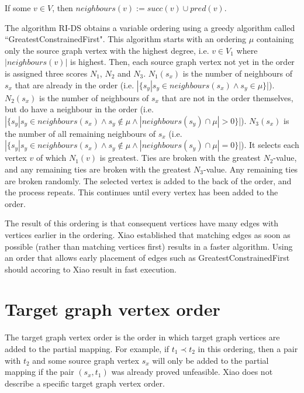 \begin{defn}
If some $v\in V$, then $\mathit{neighbours}(v):= \mathit{succ}(v) \cup \mathit{pred}(v)$.
\end{defn}



The algorithm RI-DS obtains a variable ordering using a greedy algorithm called ``GreatestConstrainedFirst". This algorithm starts with an ordering $\mu$ containing only the source graph vertex with the highest degree, i.e. $v\in V_1$ where $|\mathit{neighbours}(v)|$ is highest. Then, each source graph vertex not yet in the order is assigned three scores $N_1$, $N_2$ and $N_3$. $N_1(s_x)$ is the number of neighbours of $s_x$ that are already in the order (i.e. $|\{s_y | s_y \in \mathit{neighbours}(s_x) \land s_y \in \mu\}$|). $N_2(s_x)$ is the number of neighbours of $s_x$ that are not in the order themselves, but do have a neighbour in the order (i.e. $|\{s_y | s_y \in \mathit{neighbours}(s_x) \land s_y \not \in \mu \land |\mathit{neighbours}(s_y) \cap \mu| > 0\}$|). $N_3(s_x)$ is the number of all remaining neighbours of $s_x$ (i.e. $|\{s_y | s_y \in \mathit{neighbours}(s_x) \land s_y \not \in \mu \land |\mathit{neighbours}(s_y) \cap \mu| = 0\}$|). It selects each vertex $v$ of which $N_1(v)$ is greatest. Ties are broken with the greatest $N_2$-value, and any remaining ties are broken with the greatest $N_3$-value. Any remaining ties are broken randomly. The selected vertex is added to the back of the order, and the process repeats. This continues until every vertex has been added to the order.

The result of this ordering is that consequent vertices have many edges with vertices earlier in the ordering. Xiao established that matching edges as soon as possible (rather than matching vertices first) results in a faster algorithm. Using an order that allows early placement of edges such as GreatestConstrainedFirst should accoring to Xiao result in fast execution.
\section{Target graph vertex order}
\label{sec:targetOrder}

The target graph vertex order is the order in which target graph vertices are added to the partial mapping. For example, if $t_1 \prec t_2$ in this ordering, then a pair with $t_2$ and some source graph vertex $s_x$ will only be added to the partial mapping if the pair $(s_x, t_1)$ was already proved unfeasible. Xiao does not describe a specific target graph vertex order.

